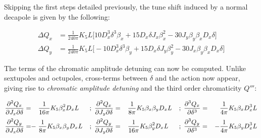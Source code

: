 Skipping the first steps detailed previously, the tune shift induced by a normal decapole is given
by the following:

\begin{equation}
  \begin{aligned}
    \Delta Q_x &= \frac{1}{240\pi} K_5 L \biggl[10 D_x^3 \delta^3 \beta_x
                                                                                                                  + 15 D_x \delta J_x \beta_x^2
                                                                                                                  - 30 J_y \beta_y \beta_x D_x \delta
                                                                                                          \biggr]\\
    \Delta Q_y &= \frac{1}{240\pi} K_5 L \biggl[-10 D_x^3 \delta^3 \beta_y
                                                                                                                  + 15 D_x \delta J_y \beta_y^2
                                                                                                                  -30 J_x \beta_y \beta_x D_x \delta
                                                                                                          \biggr]
  \end{aligned}
\end{equation}

The terms of the chromatic amplitude detuning can now be computed. Unlike sextupoles and octupoles,
cross-terms between $\delta$ and the action now appear, giving rise to \textit{chromatic
amplitude detuning} and the third order chromaticity $Q'''$:

\begin{equation}
  \small
  \begin{aligned}
      \frac{\partial^2 Q_x}{\partial J_x \partial \delta} =& &&\frac{1}{16 \pi} K_5 \beta_x^2 D_x L&&;\; 
      \frac{\partial^2 Q_x}{\partial J_y \partial \delta} =&& \frac{1}{8\pi} K_5 \beta_x \beta_y D_xL&&;\;
      \frac{\partial^3 Q_x}{\partial \delta^3} =& \frac{1}{4\pi} K_5 \beta_x D_x^3L
  \\
      \frac{\partial^2 Q_y}{\partial J_x \partial \delta} =& -\mkern-18mu&&\frac{1}{8\pi} K_5 \beta_x \beta_y D_xL&&;\;
      \frac{\partial^2 Q_y}{\partial J_y \partial \delta} =&& \frac{1}{16 \pi} K_5 \beta_y^2 D_xL &&;\; 
      \frac{\partial^3 Q_y}{\partial \delta^3} =& -\frac{1}{4\pi} K_5 \beta_y D_x^3L 
  \\
  \end{aligned}
\end{equation}

